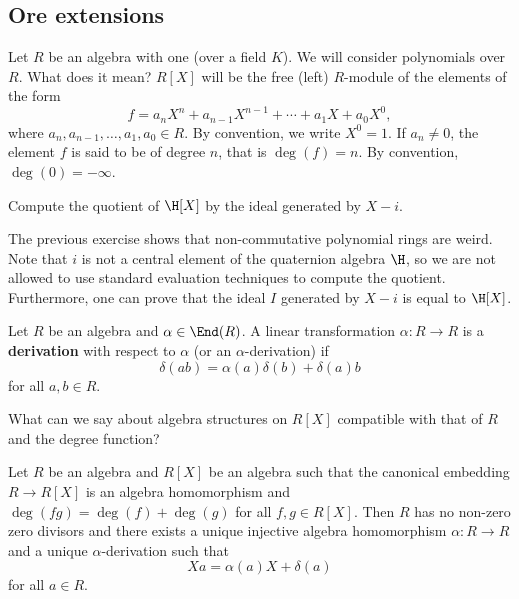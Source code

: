 \section{}

\subsection{Ore extensions}

Let $R$ be an algebra with one (over a field $K$). 
We will consider polynomials over $R$. What does it mean? $R[X]$ will 
be the free (left) $R$-module of the elements of the form
\[
f=a_nX^n+a_{n-1}X^{n-1}+\cdots+a_1X+a_0X^0,
\]
where $a_n,a_{n-1},\dots,a_1,a_0\in R$. By convention, we write $X^0=1$. 
If $a_n\ne 0$, the element
$f$ is said to be of degree $n$, that is 
$\deg(f)=n$. By convention,
$\deg(0)=-\infty$. 

\begin{exercise}
    Compute the quotient of $\H[X]$ by the ideal generated by $X-i$. 
\end{exercise}

The previous exercise shows that non-commutative polynomial rings are weird. Note that $i$ is not a central 
element of the quaternion algebra $\H$, so we are not allowed to use standard evaluation techniques to compute
the quotient. Furthermore, one can prove that the ideal $I$ generated by $X-i$ is equal to $\H[X]$. 

\begin{definition}
    Let $R$ be an algebra and $\alpha\in\End(R)$. A linear transformation $\alpha\colon R\to R$ is a \textbf{derivation}
    with respect to $\alpha$ (or an 
    $\alpha$-derivation) if 
    \[
    \delta(ab)=\alpha(a)\delta(b)+\delta(a)b
    \]
    for all $a,b\in R$. 
\end{definition}

What can we say about algebra structures on $R[X]$ compatible with that of $R$ and 
the degree function? 

\begin{theorem}
    Let $R$ be an algebra and $R[X]$ be an algebra such that 
    the canonical embedding $R\to R[X]$ is an algebra homomorphism and $\deg(fg)=\deg(f)+\deg(g)$ 
    for all $f,g\in R[X]$. Then $R$ has no non-zero zero divisors and there exists a unique injective algebra homomorphism 
    $\alpha\colon R\to R$ and a unique $\alpha$-derivation such that 
    \[
    Xa=\alpha(a)X+\delta(a)
    \]
    for all $a\in R$.    
\end{theorem}

